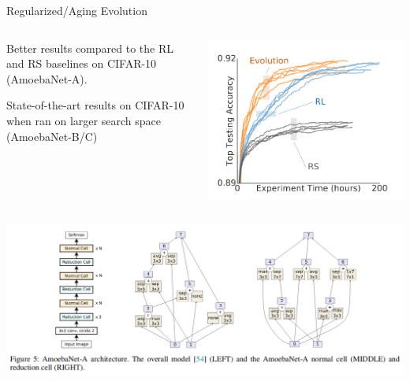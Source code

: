 \begin{frame}[c]{Regularized/Aging Evolution }

\centering
\begin{columns}[T]

\begin{itemize}
	\footnotesize{
	\item Better results compared to the RL and RS baselines on CIFAR-10 (AmoebaNet-A).
	\item State-of-the-art results on CIFAR-10 when ran on larger search space (AmoebaNet-B/C)
	}
\end{itemize}

\includegraphics[width=.9\textwidth]{images_lec7/aging_evolution_results.png}

\end{columns}
\includegraphics[width=.9\textwidth]{images_lec7/amoebanet_A.png}

\end{frame}
